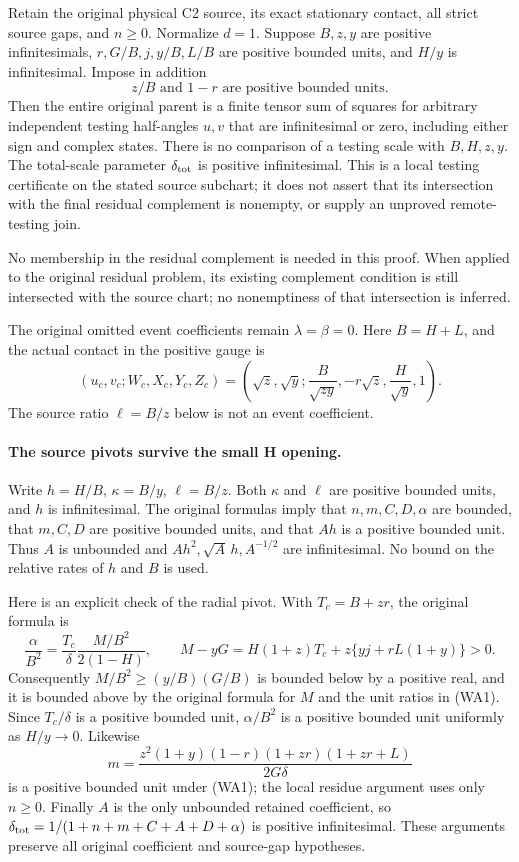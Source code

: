 \label{p9ec3d6bbd717:sec:r9-weak-A-five-root}

\begin{theorem}
Retain the original physical C2 source, its exact stationary contact,
all strict source gaps, and $n\ge0$.
Normalize $d=1$. Suppose $B,z,y$ are positive infinitesimals,
$r,G/B,j,y/B,L/B$ are positive bounded units, and $H/y$ is
infinitesimal. Impose in addition
\[
 z/B\text{ and }1-r\text{ are positive bounded units}.       \tag{WA1}
\]
Then the entire original parent is a finite tensor sum of squares
for arbitrary independent testing half-angles $u,v$ that are
infinitesimal or zero, including either sign and complex states.
There is no comparison of a testing scale with $B,H,z,y$.
The total-scale parameter $\delta_{\rm tot}$ is positive infinitesimal.
This is a local testing certificate on the stated source subchart;
it does not assert that its intersection with the final residual
complement is nonempty, or supply an unproved remote-testing join.
\end{theorem}

No membership in the residual complement is needed in this proof.
When applied to the original residual problem, its existing complement
condition is still intersected with the source chart; no nonemptiness
of that intersection is inferred.

The original omitted event coefficients remain $\lambda=\beta=0$.
Here $B=H+L$, and the actual contact in the positive gauge is
\[
 (u_c,v_c;W_c,X_c,Y_c,Z_c)
 =\left(\sqrt z,\sqrt y;\frac B{\sqrt{zy}},
                  -r\sqrt z,\frac H{\sqrt y},1\right).
\]
The source ratio $\ell=B/z$ below is not an event coefficient.

\paragraph{The source pivots survive the small H opening.}
Write $h=H/B$, $\kappa=B/y$, $\ell=B/z$. Both $\kappa$ and
$\ell$ are positive bounded units, and $h$ is infinitesimal.
The original formulas imply that $n,m,C,D,\alpha$ are bounded,
that $m,C,D$ are positive bounded units, and that $Ah$ is a
positive bounded unit. Thus $A$ is unbounded and
$Ah^2,\sqrt A\,h,A^{-1/2}$ are infinitesimal. No bound on the
relative rates of $h$ and $B$ is used.

Here is an explicit check of the radial pivot. With $T_c=B+zr$,
the original formula is
\[
 \frac\alpha{B^2}
   =\frac{T_c}{\delta}\frac{M/B^2}{2(1-H)},\qquad
 M-yG=H(1+z)T_c+z\{yj+rL(1+y)\}>0.                  \tag{WA2}
\]
Consequently $M/B^2\ge(y/B)(G/B)$ is bounded below by a
positive real, and it is bounded above by the original formula
for $M$ and the unit ratios in (WA1). Since $T_c/\delta$ is a
positive bounded unit, $\alpha/B^2$ is a positive bounded unit
uniformly as $H/y\to0$. Likewise
\[
 m=\frac{z^2(1+y)(1-r)(1+zr)(1+zr+L)}{2G\delta}
\]
is a positive bounded unit under (WA1); the local residue argument
uses only $n\ge0$. Finally $A$ is the only unbounded retained coefficient, so
$\delta_{\rm tot}=1/(1+n+m+C+A+D+\alpha)$ is positive
infinitesimal. These arguments preserve all original coefficient
and source-gap hypotheses.

